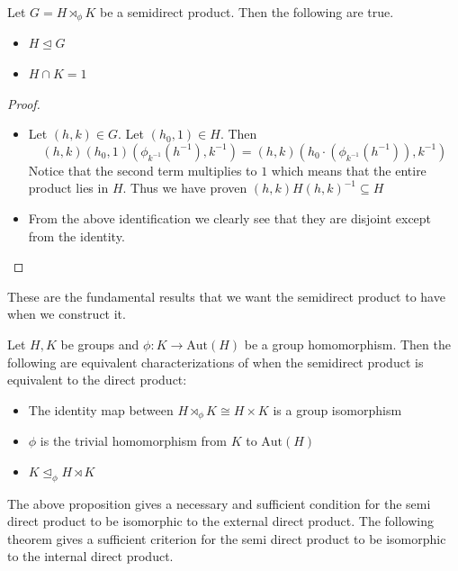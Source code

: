 \documentclass[a4paper]{article}
\begin{document}
\begin{lmm}{}{} Let $G=H\rtimes_\phi K$ be a semidirect product. Then the following are true. 
\begin{itemize}
\item $H\trianglelefteq G$
\item $H\cap K=1$
\end{itemize}
\begin{proof}~\\
\begin{itemize}
\item Let $(h,k)\in G$. Let $(h_0,1)\in H$. Then $$(h,k)(h_0,1)(\phi_{k^{-1}}(h^{-1}),k^{-1})=(h,k)(h_0\cdot(\phi_{k^{-1}}(h^{-1})),k^{-1})$$ Notice that the second term multiplies to $1$ which means that the entire product lies in $H$. Thus we have proven $(h,k)H(h,k)^{-1}\subseteq H$
\item From the above identification we clearly see that they are disjoint except from the identity. 
\end{itemize}
\end{proof}
\end{lmm}

These are the fundamental results that we want the semidirect product to have when we construct it. 

\begin{prp}{}{} Let $H,K$ be groups and $\phi:K\to\text{Aut}(H)$ be a group homomorphism. Then the following are equivalent characterizations of when the semidirect product is equivalent to the direct product: 
\begin{itemize}
\item The identity map between $H\rtimes_\phi K\cong H\times K$ is a group isomorphism
\item $\phi$ is the trivial homomorphism from $K$ to $\text{Aut}(H)$
\item $K\trianglelefteq_\phi H\rtimes K$
\end{itemize}
\end{prp}

The above proposition gives a necessary and sufficient condition for the semi direct product to be isomorphic to the external direct product. The following theorem gives a sufficient criterion for the semi direct product to be isomorphic to the internal direct product. 
\end{document}

